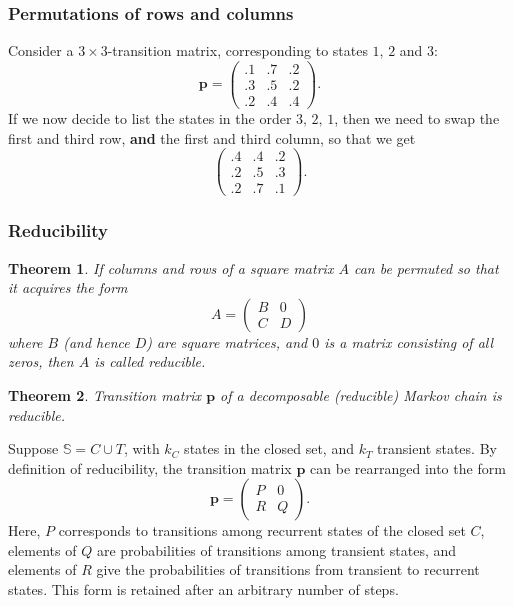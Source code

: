 \documentclass{article}
\newtheorem{theorem}{Theorem}
\newcommand{\Space}{\mathbb{S}}
\begin{document}
\subsubsection{Permutations of rows and columns}
Consider a $3\times 3$-transition matrix, corresponding to states $1,\,2$ and $3$:
\begin{equation}
    \mathbf{p} =
    \begin{pmatrix}
        .1 & .7 & .2 \\ .3 & .5 & .2 \\ .2 & .4 & .4
    \end{pmatrix}. \nonumber
\end{equation}
If we now decide to list the states in the order $3,\,2,\,1$, then we need to swap the first and third row, \textbf{and} the first and third column, so that we get
\begin{equation}
    \begin{pmatrix}
        .4 & .4 & .2 \\ .2 & .5 & .3 \\ .2 & .7 & .1
    \end{pmatrix}. \nonumber
\end{equation}

\subsubsection{Reducibility}
\begin{theorem}
    If columns and rows of a square matrix $A$ can be permuted so that it acquires the form
    \begin{equation}
    A =
        \begin{pmatrix}
        B & 0 \\ C & D    
        \end{pmatrix}
    \end{equation}
    where $B$ (and hence $D$) are square matrices, and $0$ is a matrix consisting of all zeros, then $A$ is called reducible.
\end{theorem}
\begin{theorem}
    Transition matrix $\mathbf{p}$ of a decomposable (reducible) Markov chain is reducible.
\end{theorem}
Suppose $\Space = C\cup T$, with $k_C$ states in the closed set, and $k_T$ transient states. By definition of reducibility, the transition matrix $\mathbf{p}$ can be rearranged into the form
\begin{equation}
    \mathbf{p} = 
    \begin{pmatrix}
        P & 0 \\ R & Q    
        \end{pmatrix}.
\end{equation}
Here, $P$ corresponds to transitions among recurrent states of the closed set $C$, elements of $Q$ are probabilities of transitions among transient states, and elements of $R$ give the probabilities of transitions from transient to recurrent states. This form is retained after an arbitrary number of steps.
\end{document}
